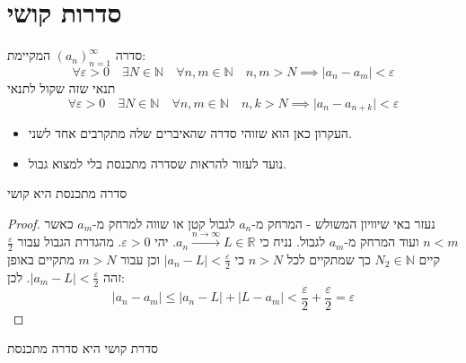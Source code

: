 \documentclass{tstextbook}
\begin{document}
\section{סדרות קושי}

\begin{definition}
סדרה \((a_n)_{n=1}^\infty\) המקיימת:
$$\forall \varepsilon > 0\quad \exists N \in \mathbb{N}\quad \forall n,m \in \mathbb{N}\quad n,m>N\implies \lvert a_{n}-a_{m} \rvert <\varepsilon$$
תנאי שזה שקול לתנאי 
$$\forall \varepsilon > 0\quad \exists N \in \mathbb{N}\quad \forall n,m \in \mathbb{N}\quad n,k>N\implies \lvert a_{n}-a_{n+k} \rvert <\varepsilon$$

  \begin{itemize}
    \item העקרון כאן הוא שזוהי סדרה שהאיברים שלה מתקרבים אחד לשני.
    \item נועד לעזור להראות שסדרה מתכנסת בלי למצוא גבול.
  \end{itemize}
\end{definition}
\begin{proposition}
סדרה מתכנסת היא קושי

\end{proposition}
\begin{proof}
נעזר באי שיוויון המשולש - המרחק מ-\(a_{n}\) לגבול קטן או שווה למרחק מ-\(a_{m}\) כאשר \(n<m\) ועוד המרחק מ-\(a_{m}\) לגבול.
נניח כי \(a_{n}\xrightarrow{n\to \infty}L \in \mathbb{R}\). יהי \(\varepsilon>0\). מהגדרת הגבול עבור \(\frac{\varepsilon}{2}\) קיים \(N_{2} \in \mathbb{N}\) כך שמתקיים לכל \(n>N\) כי \(\lvert a_{n}-L \rvert<\frac{\varepsilon}{2}\) וכן
עבור \(m>N\) מתקיים באופן זהה \(\lvert a_{m}-L \rvert<\frac{\varepsilon}{2}\). לכן:
$$\lvert a_{n}-a_{m} \rvert \leq \lvert a_{n}-L \rvert +\lvert L-a_{m} \rvert <\frac{\varepsilon}{2}+\frac{\varepsilon}{2}=\varepsilon$$

\end{proof}
\begin{proposition}
סדרת קושי היא סדרה מתכנסת

\end{proposition}
\end{document}

